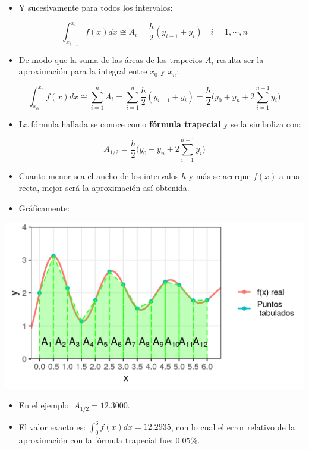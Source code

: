 \documentclass[openany]{book}
\providecommand{\tightlist}{%
  \setlength{\itemsep}{0pt}\setlength{\parskip}{0pt}}
\begin{document}
\begin{itemize}
\tightlist
\item
  Y sucesivamente para todos los intervalos:
\end{itemize}

\[
\int_{x_{i-1}}^{x_i} f(x)dx \cong A_i = \frac{h}{2} (y_{i-1} + y_i) \quad i = 1, \cdots, n
\]

\begin{itemize}
\tightlist
\item
  De modo que la suma de las áreas de los trapecios \(A_i\) resulta ser la aproximación para la integral entre \(x_0\) y \(x_n\):
\end{itemize}

\[
\int_{x_{0}}^{x_n} f(x)dx \cong \sum_{i=1}^n A_i = \sum_{i=1}^n \frac{h}{2} (y_{i-1} + y_i) = \frac{h}{2} \Big( y_0 + y_n + 2 \sum_{i = 1}^{n-1} y_i \Big)
\]

\begin{itemize}
\tightlist
\item
  La fórmula hallada se conoce como \textbf{fórmula trapecial} y se la simboliza con:
\end{itemize}

\[
A_{1/2} = \frac{h}{2} \Big( y_0 + y_n + 2 \sum_{i = 1}^{n-1} y_i \Big)
\]

\begin{itemize}
\tightlist
\item
  Cuanto menor sea el ancho de los intervalos \(h\) y más se acerque \(f(x)\) a una recta, mejor será la aproximación así obtenida.
\item
  Gráficamente:
\end{itemize}

\begin{center}\includegraphics[width=0.85\linewidth]{Plots/U4/Unidad4_2_g4} \end{center}

\begin{itemize}
\tightlist
\item
  En el ejemplo: \(A_{1/2} = 12.3000\).
\item
  El valor exacto es: \(\int_0^{6}f(x)dx = 12.2935\), con lo cual el error relativo de la aproximación con la fórmula trapecial fue: \(0.05\%\).
\end{itemize}
\end{document}
